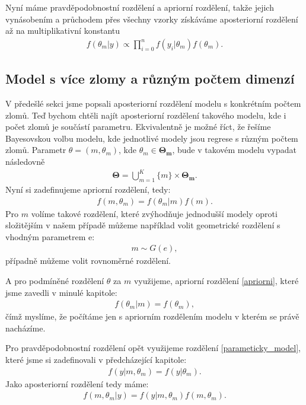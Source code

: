 \documentclass[czech,master,public,dept470,male,cpdeclaration,oneside, python]{diploma}
\begin{document}
Nyní máme pravděpodobnostní rozdělení a apriorní rozdělení, takže jejich vynásobením a průchodem přes všechny vzorky získáváme aposteriorní rozdělení až na multiplikativní konstantu
\begin{align}
f(\theta_m | y) \propto \prod_{i=0}^{n} f(y_i | \theta_m) f(\theta_m).
\end{align}
\subsection{Model s více zlomy a různým počtem dimenzí}
V předešlé sekci jsme popsali aposteriorní rozdělení modelu s konkrétním počtem zlomů. Teď bychom chtěli najít aposteriorní rozdělení takového modelu, kde i počet zlomů je součástí parametru. Ekvivalentně je možné říct, že řešíme Bayesovskou volbu modelu, kde jednotlivé modely jsou regrese s různým počtem zlomů. Parametr $\theta = (m, \theta_m)$, kde $\theta_m \in \boldsymbol{\Theta_m}$, bude v takovém modelu vypadat následovně 
\begin{align}
\boldsymbol{\Theta} = \bigcup_{m=1}^K\{m\} \times \boldsymbol{\Theta_m}.
\end{align}
 Nyní si zadefinujeme apriorní rozdělení, tedy:
\begin{align}
f(m, \theta_m) = f(\theta_m | m)f(m).
\end{align}
Pro $m$ volíme takové rozdělení, které zvýhodňuje jednodušší modely oproti složitějším v našem případě můžeme například volit geometrické rozdělení s vhodným parametrem e:
\begin{align}
m \sim G(e),
\end{align}
případně můžeme volit rovnoměrné rozdělení. \par
A pro podmíněné rozdělení $\theta$ za $m$ využijeme, apriorní rozdělení \eqref{apriorni}, které jsme zavedli v minulé kapitole:
\begin{align}
f(\theta_m | m) = f(\theta_m),
\end{align}
čímž myslíme, že počítáme jen s apriorním rozdělením modelu v kterém se právě nacházíme. \par 
Pro pravděpodobnostní rozdělení opět využijeme rozdělení \eqref{parameticky_model}, které jsme si zadefinovali v předcházející kapitole:
\begin{align}
f(y | m, \theta_m) = f(y | \theta_m).
\end{align}
Jako aposteriorní rozdělení tedy máme:
\begin{align}\label{supermodel}
	f(m, \theta_m | y) = f(y | m, \theta_m)f(m, \theta_m).
\end{align}
\end{document}
